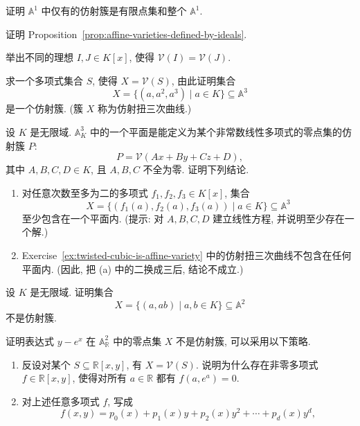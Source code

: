 \BookExerciseHeading
\begin{BookExercises}
  \item\label{ex:affine-varieties-on-the-line} 证明 $\mathbb{A}^{1}$ 中仅有的仿射簇是有限点集和整个 $\mathbb{A}^{1}$.
  \item\label{ex:prove-ideals-define-affine-varieties} 证明 Proposition~\ref{prop:affine-varieties-defined-by-ideals}.
  \item\label{ex:distinct-ideals-same-variety} 举出不同的理想 $I,J\in K[x]$, 使得 $\mathcal{V}(I)=\mathcal{V}(J)$.
  \item\label{ex:twisted-cubic-is-affine-variety} 求一个多项式集合 $S$, 使得 $X=\mathcal{V}(S)$, 由此证明集合
    \[
      X=\{(a,a^{2},a^{3})\mid a\in K\}\subseteq\mathbb{A}^{3}
    \]
    是一个仿射簇. (簇 $X$ 称为仿射扭三次曲线.)
  \item\label{ex:containment-in-affine-plane} 设 $K$ 是无限域. $\mathbb{A}^{3}_{K}$ 中的一个平面是能定义为某个非常数线性多项式的零点集的仿射簇 $P$:
    \[
      P=\mathcal{V}(Ax+By+Cz+D),
    \]
    其中 $A,B,C,D\in K$, 且 $A,B,C$ 不全为零. 证明下列结论.
    \begin{enumerate}[label=(\alph*)]
      \item 对任意次数至多为二的多项式 $f_{1},f_{2},f_{3}\in K[x]$, 集合
        \[
          X=\{(f_{1}(a),f_{2}(a),f_{3}(a))\mid a\in K\}\subseteq\mathbb{A}^{3}
        \]
        至少包含在一个平面内. (提示: 对 $A,B,C,D$ 建立线性方程, 并说明至少存在一个解.)
      \item Exercise~\ref{ex:twisted-cubic-is-affine-variety} 中的仿射扭三次曲线不包含在任何平面内. (因此, 把 (a) 中的\textquotedbl{}二\textquotedbl{}换成\textquotedbl{}三\textquotedbl{}后, 结论不成立.)
    \end{enumerate}
  \item\label{ex:parameterized-set-not-affine-variety} 设 $K$ 是无限域. 证明集合
    \[
      X=\{(a,ab)\mid a,b\in K\}\subseteq\mathbb{A}^{2}
    \]
    不是仿射簇.
  \item\label{ex:prove-exponential-graph-not-affine-variety} 证明表达式 $y-e^{x}$ 在 $\mathbb{A}^{2}_{\mathbb{R}}$ 中的零点集 $X$ 不是仿射簇, 可以采用以下策略.
    \begin{enumerate}[label=(\alph*)]
      \item 反设对某个 $S\subseteq\mathbb{R}[x,y]$, 有 $X=\mathcal{V}(S)$. 说明为什么存在非零多项式 $f\in\mathbb{R}[x,y]$, 使得对所有 $a\in\mathbb{R}$ 都有 $f(a,e^{a})=0$.
      \item 对上述任意多项式 $f$, 写成
        \[
          f(x,y)=p_{0}(x)+p_{1}(x)y+p_{2}(x)y^{2}+\cdots+p_{d}(x)y^{d},
\]
\end{enumerate}
\end{BookExercises}
